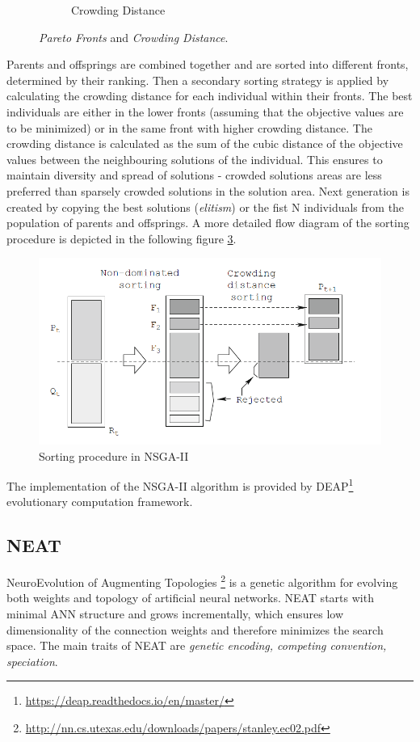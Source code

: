 \documentclass[format=acmsmall, review=false, screen=true]{acmart}
\begin{document}
\begin{figure}[H]
\begin{subfigure}[t]{0.43\textwidth}
    \caption{\label{fig:endings}Crowding Distance}
  \end{subfigure}
  \caption{\textit{Pareto Fronts} and \textit{Crowding Distance}.}
  \label{fig:action-ending-diagram}
\end{figure}


Parents and offsprings are combined together and are sorted into different fronts, determined by their ranking. Then a secondary sorting strategy is applied by calculating the crowding distance for each individual within their fronts. The best individuals are either in the lower fronts (assuming that the objective values are to be minimized) or in the same front with higher crowding distance. The crowding distance is calculated as the sum of the cubic distance of the objective values between the neighbouring solutions of the individual. This ensures to maintain diversity and spread of solutions - crowded solutions areas are less preferred than sparsely crowded solutions in the solution area. Next generation is created by copying the best solutions (\emph{elitism}) or the fist N individuals from the population of parents and offsprings. A more detailed flow diagram of the sorting procedure is depicted in the following figure \ref{fig:nsga}.

\begin{figure}[H]
  \includegraphics[width=0.66\linewidth]{img/nsga.PNG}
  \caption{\label{fig:nsga}Sorting procedure in NSGA-II}
\end{figure}

The implementation of the NSGA-II algorithm is provided by DEAP\footnote{\url{https://deap.readthedocs.io/en/master/}} evolutionary computation framework.

\subsection{NEAT}

NeuroEvolution of Augmenting Topologies \footnote{\url{http://nn.cs.utexas.edu/downloads/papers/stanley.ec02.pdf}} is a genetic algorithm for evolving both weights and topology of artificial neural networks. NEAT starts with minimal ANN structure and grows incrementally, which ensures low dimensionality of the connection weights and therefore minimizes the search space. The main traits  of NEAT are \emph{genetic encoding, competing convention, speciation}.
\end{document}
